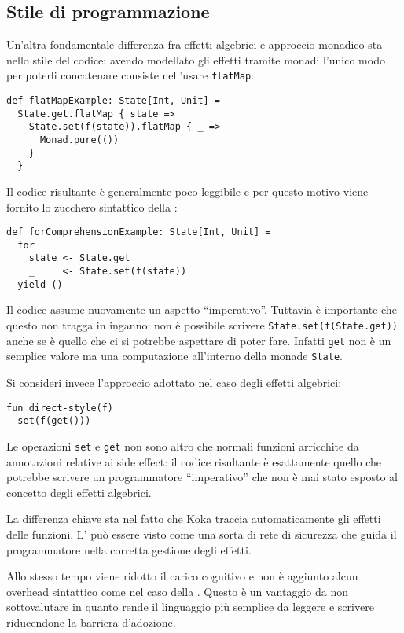 \subsection{Stile di programmazione}
Un'altra fondamentale differenza fra effetti algebrici e approccio monadico sta nello stile del codice: avendo modellato gli effetti tramite monadi l'unico modo per poterli concatenare consiste nell'usare \lstinline{flatMap}:
\begin{lstlisting}[language=scala3]
def flatMapExample: State[Int, Unit] =
  State.get.flatMap { state =>
    State.set(f(state)).flatMap { _ => 
      Monad.pure(())
    }
  }
\end{lstlisting}
Il codice risultante è generalmente poco leggibile e per questo motivo viene fornito lo zucchero sintattico della :
\begin{lstlisting}[language=scala3]
def forComprehensionExample: State[Int, Unit] =
  for
    state <- State.get
    _     <- State.set(f(state))
  yield ()
\end{lstlisting}
Il codice assume nuovamente un aspetto ``imperativo''. Tuttavia è importante che questo non tragga in inganno: non è possibile scrivere
\lstinline{State.set(f(State.get))} anche se è quello che ci si potrebbe aspettare di poter fare.
Infatti \lstinline{get} non è un semplice valore ma una computazione all'interno della monade \lstinline{State}.

Si consideri invece l'approccio adottato nel caso degli effetti algebrici:
\begin{lstlisting}[language=koka]
fun direct-style(f)
  set(f(get()))
\end{lstlisting}

Le operazioni \lstinline{set} e \lstinline{get} non sono altro che normali funzioni arricchite da annotazioni relative ai side effect: il codice risultante è esattamente quello che potrebbe scrivere un programmatore ``imperativo'' che non è mai stato esposto al concetto degli effetti algebrici.

La differenza chiave sta nel fatto che Koka traccia automaticamente gli effetti delle funzioni. L' può essere visto come una sorta di rete di sicurezza che guida il programmatore nella corretta gestione degli effetti.

Allo stesso tempo viene ridotto il carico cognitivo e non è aggiunto alcun overhead sintattico come nel caso della .
Questo è un vantaggio da non sottovalutare in quanto rende il linguaggio più semplice da leggere e scrivere riducendone la barriera d'adozione.
